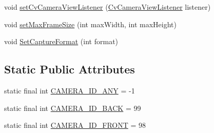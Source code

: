 \begin{DoxyCompactItemize}
\item 
void \mbox{\hyperlink{classorg_1_1opencv_1_1android_1_1_camera_bridge_view_base_ab2af409903c7d262db39a1e39cde9f9c}{set\+Cv\+Camera\+View\+Listener}} (\mbox{\hyperlink{interfaceorg_1_1opencv_1_1android_1_1_camera_bridge_view_base_1_1_cv_camera_view_listener}{Cv\+Camera\+View\+Listener}} listener)
\item 
void \mbox{\hyperlink{classorg_1_1opencv_1_1android_1_1_camera_bridge_view_base_a8166e82c8dde050925312149f77fe0b6}{set\+Max\+Frame\+Size}} (int max\+Width, int max\+Height)
\item 
void \mbox{\hyperlink{classorg_1_1opencv_1_1android_1_1_camera_bridge_view_base_a167c739cd30f94d64f7a7441b97c514a}{Set\+Capture\+Format}} (int format)
\end{DoxyCompactItemize}
\subsection*{Static Public Attributes}
\begin{DoxyCompactItemize}
\item 
static final int \mbox{\hyperlink{classorg_1_1opencv_1_1android_1_1_camera_bridge_view_base_adb9fe0de7cb47fb89e3450eb4e4ef1b5}{C\+A\+M\+E\+R\+A\+\_\+\+I\+D\+\_\+\+A\+NY}} = -\/1
\item 
static final int \mbox{\hyperlink{classorg_1_1opencv_1_1android_1_1_camera_bridge_view_base_a90bc4fcd1221e73e93e1ab852ce48ac6}{C\+A\+M\+E\+R\+A\+\_\+\+I\+D\+\_\+\+B\+A\+CK}} = 99
\item 
static final int \mbox{\hyperlink{classorg_1_1opencv_1_1android_1_1_camera_bridge_view_base_a8856ad5686ec518ff7987a2d12ee17ae}{C\+A\+M\+E\+R\+A\+\_\+\+I\+D\+\_\+\+F\+R\+O\+NT}} = 98
\end{DoxyCompactItemize}
